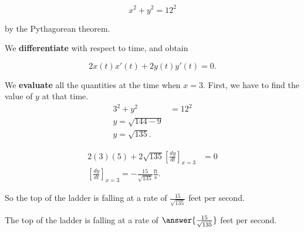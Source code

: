 \documentclass{ximera}
\begin{document}
\begin{exercise}
\begin{hint}
\[
x^2 + y^2 = 12^2
\]

by the Pythagorean theorem.
\end{hint}

\begin{hint}
	We \textbf{differentiate} with respect to time, and obtain

\[
2x(t)x'(t)+2y(t)y'(t) = 0.
\]
\end{hint}

\begin{hint}
	We \textbf{evaluate} all the quantities  at the time when $x=3$. First, we have to find the value of $y$ at that time.
\begin{align*}
	3^2 +y^2 &= 12^2\\ 
	y = \sqrt{144-9}\\
	y = \sqrt{135}.
\end{align*}
\end{hint}

\begin{hint}
	 
\begin{align*}
2(3)(5)+2\sqrt{135}\left[\frac{dy}{dt}\right]_{x=3} &=0\\
\left[\frac{dy}{dt}\right]_{x=3} = -\frac{15}{\sqrt{135}}\frac{\textrm{ft}}{\textrm{s}}.
\end{align*}

So the top of the ladder is falling at  a rate of $\frac{15}{\sqrt{135}}$ feet per second.

\end{hint}

\begin{prompt}
	The top of the ladder is falling at a rate of $\answer{\frac{15}{\sqrt{135}}}$ feet per second.
\end{prompt}

\end{exercise}
\end{document}
